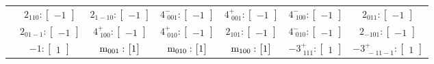 \documentclass[fleqn,8pt,landscape]{jsarticle}
\begin{document}
\begin{longtable}{ccccccc}
& $ 2{}_{110}:\begin{bmatrix} -1 \end{bmatrix} $ & $ 2{}_{1-10}:\begin{bmatrix} -1 \end{bmatrix} $ & $ 4^{-}_{\,\,001}:\begin{bmatrix} -1 \end{bmatrix} $ & $ 4^{+}_{\,\,001}:\begin{bmatrix} -1 \end{bmatrix} $ & $ 4^{-}_{\,\,100}:\begin{bmatrix} -1 \end{bmatrix} $ & $ 2{}_{011}:\begin{bmatrix} -1 \end{bmatrix} $ \\
& $ 2{}_{01-1}:\begin{bmatrix} -1 \end{bmatrix} $ & $ 4^{+}_{\,\,100}:\begin{bmatrix} -1 \end{bmatrix} $ & $ 4^{+}_{\,\,010}:\begin{bmatrix} -1 \end{bmatrix} $ & $ 2{}_{101}:\begin{bmatrix} -1 \end{bmatrix} $ & $ 4^{-}_{\,\,010}:\begin{bmatrix} -1 \end{bmatrix} $ & $ 2{}_{-101}:\begin{bmatrix} -1 \end{bmatrix} $ \\
& $ -1:\begin{bmatrix} 1 \end{bmatrix} $ & $ {\rm m}_{001}:\begin{bmatrix} 1 \end{bmatrix} $ & $ {\rm m}_{010}:\begin{bmatrix} 1 \end{bmatrix} $ & $ {\rm m}_{100}:\begin{bmatrix} 1 \end{bmatrix} $ & $ -3^{+}_{\,\,111}:\begin{bmatrix} 1 \end{bmatrix} $ & $ -3^{+}_{\,\,-11-1}:\begin{bmatrix} 1 \end{bmatrix} $ \\

\end{longtable}
\end{document}
